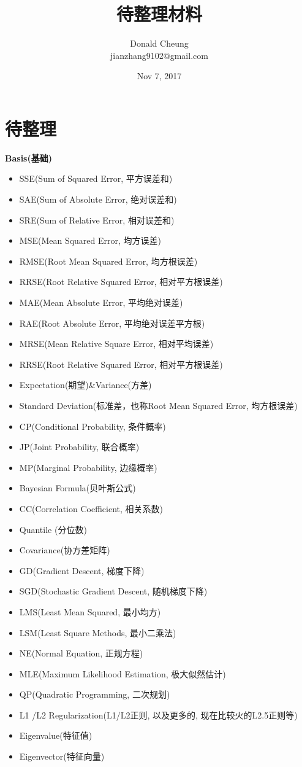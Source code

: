 \documentclass[10pt,a4paper]{ctexbook}
\begin{document}
    \setlength{\baselineskip}{20pt}
    \title{待整理材料}
    \author{Donald Cheung\\jianzhang9102@gmail.com}
    \date{Nov 7, 2017}
    \tableofcontents
\fi

\chapter{待整理}
\textbf{Basis(基础)}
\begin{itemize}
\item SSE(Sum of Squared Error, 平方误差和)
\item SAE(Sum of Absolute Error, 绝对误差和)
\item SRE(Sum of Relative Error, 相对误差和)
\item MSE(Mean Squared Error, 均方误差)
\item RMSE(Root Mean Squared Error, 均方根误差)
\item RRSE(Root Relative Squared Error, 相对平方根误差)
\item MAE(Mean Absolute Error, 平均绝对误差)
\item RAE(Root Absolute Error, 平均绝对误差平方根)
\item MRSE(Mean Relative Square Error, 相对平均误差)
\item RRSE(Root Relative Squared Error, 相对平方根误差)
\item Expectation(期望)\&Variance(方差)
\item Standard Deviation(标准差，也称Root Mean Squared Error, 均方根误差)
\item CP(Conditional Probability, 条件概率)
\item JP(Joint Probability, 联合概率)
\item MP(Marginal Probability, 边缘概率)
\item Bayesian Formula(贝叶斯公式)
\item CC(Correlation Coefficient, 相关系数)
\item Quantile (分位数)
\item Covariance(协方差矩阵)
\item GD(Gradient Descent, 梯度下降)
\item SGD(Stochastic Gradient Descent, 随机梯度下降)
\item LMS(Least Mean Squared, 最小均方)
\item LSM(Least Square Methods, 最小二乘法)
\item NE(Normal Equation, 正规方程)
\item MLE(Maximum Likelihood Estimation, 极大似然估计)
\item QP(Quadratic Programming, 二次规划)
\item L1 /L2 Regularization(L1/L2正则, 以及更多的, 现在比较火的L2.5正则等)
\item Eigenvalue(特征值)
\item Eigenvector(特征向量)
\end{itemize}
\end{document}
